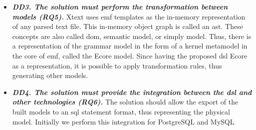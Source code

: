 \begin{itemize}
    \item\textit{\textbf{DD3. The solution must perform the transformation between models (RQ5).}}
    Xtext uses \ac{emf} templates as the in-memory representation of any parsed text file.
    This in-memory object graph is called an \ac{ast}.
    These concepts are also called \ac{dom}, semantic model, or simply model.
    Thus, there is a representation of the grammar model in the form of a kernel metamodel in the core of \ac{emf}, called the Ecore model.
    Since having the proposed \ac{dsl} Ecore as a representation, it is possible to apply transformation rules, thus generating other models.
    
    \item\textit{\textbf{DD4. The solution must provide the integration between the \ac{dsl} and other technologies (RQ6).}}
    The solution should allow the export of the built models to an \ac{sql} statement format, thus representing the physical model.
    Initially we perform this integration for PostgreSQL and MySQL
    

\end{itemize}
